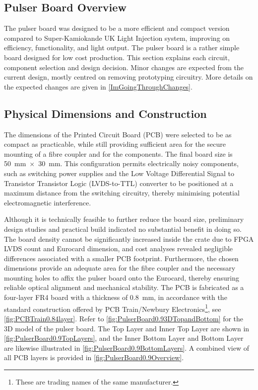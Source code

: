 \documentclass[a4paper,11pt]{article}
\begin{document}
\subsection{Pulser Board Overview}

The pulser board was designed to be a more efficient and compact version compared to Super-Kamiokande UK Light Injection system, improving on efficiency, functionality, and light output. The pulser board is a rather simple board designed for low cost production. This section explains each circuit, component selection and design decision. Minor changes are expected from the current design, mostly centred on removing prototyping circuitry. More details on the expected changes are given in \cref{ImGoingThroughChanges}.


\subsection{Physical Dimensions and Construction}

The dimensions of the Printed Circuit Board (PCB) were selected to be as compact as practicable, while still providing sufficient area for the secure mounting of a fibre coupler and for the components. The final board size is 50~mm~$\times$~30~mm. This configuration permits electrically noisy components, such as switching power supplies and the Low Voltage Differential Signal to Transistor Transistor Logic (LVDS-to-TTL) converter to be positioned at a maximum distance from the switching circuitry, thereby minimising potential electromagnetic interference.

Although it is technically feasible to further reduce the board size, preliminary design studies and practical build indicated no substantial benefit in doing so. The board density cannot be significantly increased inside the crate due to  FPGA LVDS count and Eurocard dimension, and cost analyses revealed negligible differences associated with a smaller PCB footprint. Furthermore, the chosen dimensions provide an adequate area for the fibre coupler and the necessary mounting holes to affix the pulser board onto the Eurocard, thereby ensuring reliable optical alignment and mechanical stability.
The PCB is fabricated as a four-layer FR4 \cite{FR-4}  board with a thickness of 0.8~mm, in accordance with the standard construction offered by PCB Train/Newbury Electronics\footnote{These are trading names of the same manufacturer.}, see \cref{fig:PCBTrain0.84layer}. Refer to \cref{fig:PulserBoard0.93DTopandBottom} for the 3D model of the pulser board. The Top Layer and Inner Top Layer are shown in \cref{fig:PulserBoard0.9TopLayers}, and the Inner Bottom Layer and Bottom Layer are likewise illustrated in \cref{fig:PulserBoard0.9BottomLayers}. A combined view of all PCB layers is provided in \cref{fig:PulserBoard0.9Overview}.
\end{document}
